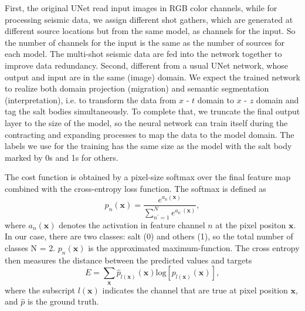 \documentclass{segabs}
\begin{document}
First, the original UNet read input images in RGB color channels, while for processing seismic data, we assign different shot gathers, which are generated at different source locations but from the same model, as channels for the input. So the number of channels for the input is the same as the number of sources for each model. The multi-shot seismic data are fed into the network together to improve data redundancy. Second, different from a usual UNet network, whose output and input are in the same (image) domain. We expect the trained network to realize both domain projection (migration) and semantic segmentation (interpretation), i.e. to transform the data from $x$ - $t$ domain to $x$ - $z$ domain and tag the salt bodies simultaneously. To complete that, we truncate the final output layer to the size of the model, so the neural network can train itself during the contracting and expanding processes to map the data to the model domain.
The labels we use for the training has the same size as the model with the salt body marked by 0s and 1s for others.

The cost function is obtained by a pixel-size softmax over the final feature map combined with the cross-entropy loss function. The softmax is defined as 
\begin{equation}
p_n(\boldsymbol{x})=\frac{e^{{a_n(\boldsymbol{x})}}}{\sum_{n^\prime=1}^{N}e^{a_{n^\prime}(\boldsymbol{x})}},
\label{eqn:softmax}
\end{equation}
where $a_{n}(\boldsymbol{x})$ denotes the activation in feature channel $n$ at the pixel positon $\boldsymbol{x}$. In our case, there are two classes: salt (0) and others (1), so the total number of classes N = 2. $p_n(\boldsymbol{x})$ is the approximated maximum-function. The cross entropy then measures the distance between the predicted values and targets
\begin{equation}
E=\sum_{\boldsymbol{x}}
	\hat{p}_{l(\boldsymbol{x})}(\boldsymbol{x})
	\mathrm{log}[
	p_{l(\boldsymbol{x})}(\boldsymbol{x})
	],
\label{eqn:crossentropy}
\end{equation}
where the subscript $l(\boldsymbol{x})$ indicates the channel that are true at pixel position $\boldsymbol{x}$, and $\hat{p}$ is the ground truth.
\end{document}
